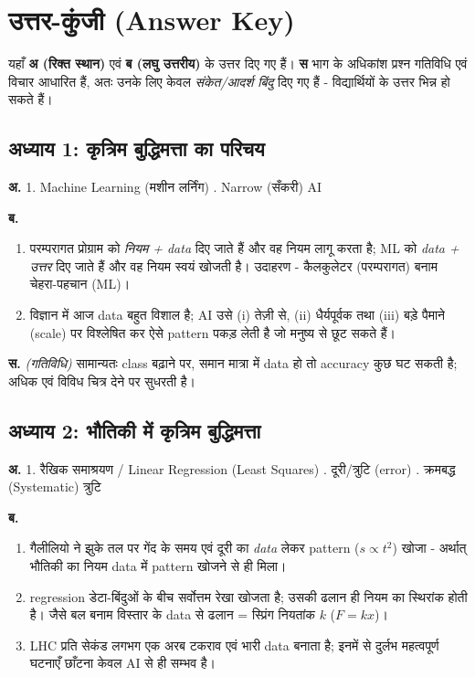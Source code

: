 \chapter*{उत्तर-कुंजी (Answer Key)}

यहाँ \textbf{अ (रिक्त स्थान)} एवं \textbf{ब (लघु उत्तरीय)} के उत्तर दिए गए हैं। \textbf{स}
भाग के अधिकांश प्रश्न गतिविधि एवं विचार आधारित हैं, अतः उनके लिए केवल \emph{संकेत/आदर्श
बिंदु} दिए गए हैं - विद्यार्थियों के उत्तर भिन्न हो सकते हैं।

\section*{अध्याय 1: कृत्रिम बुद्धिमत्ता का परिचय}
\textbf{अ.} 1. Machine Learning (मशीन लर्निंग) . Narrow (सँकरी) AI

\noindent\textbf{ब.}
\begin{enumerate}[leftmargin=1.6em]
  \item परम्परागत प्रोग्राम को \emph{नियम + data} दिए जाते हैं और वह नियम लागू करता है;
        ML को \emph{data + उत्तर} दिए जाते हैं और वह नियम स्वयं खोजती है। उदाहरण -
        कैलकुलेटर (परम्परागत) बनाम चेहरा-पहचान (ML)।
  \item विज्ञान में आज data बहुत विशाल है; AI उसे (i) तेज़ी से, (ii) धैर्यपूर्वक तथा
        (iii) बड़े पैमाने (scale) पर विश्लेषित कर ऐसे pattern पकड़ लेती है जो मनुष्य से
        छूट सकते हैं।
\end{enumerate}

\noindent\textbf{स.} \textit{(गतिविधि)} सामान्यतः class बढ़ाने पर, समान मात्रा में
data हो तो accuracy कुछ घट सकती है; अधिक एवं विविध चित्र देने पर सुधरती है।

\section*{अध्याय 2: भौतिकी में कृत्रिम बुद्धिमत्ता}
\textbf{अ.} 1. रैखिक समाश्रयण / Linear Regression (Least Squares) . दूरी/त्रुटि (error) . क्रमबद्ध (Systematic) त्रुटि

\noindent\textbf{ब.}
\begin{enumerate}[leftmargin=1.6em]
  \item गैलीलियो ने झुके तल पर गेंद के समय एवं दूरी का \emph{data} लेकर pattern
        ($s \propto t^2$) खोजा - अर्थात् भौतिकी का नियम data में pattern खोजने से ही मिला।
  \item regression डेटा-बिंदुओं के बीच सर्वोत्तम रेखा खोजता है; उसकी ढलान ही नियम का
        स्थिरांक होती है। जैसे बल बनाम विस्तार के data से ढलान = स्प्रिंग नियतांक $k$
        ($F = kx$)।
  \item LHC प्रति सेकंड लगभग एक अरब टकराव एवं भारी data बनाता है; इनमें से दुर्लभ
        महत्वपूर्ण घटनाएँ छाँटना केवल AI से ही सम्भव है।
\end{enumerate}

